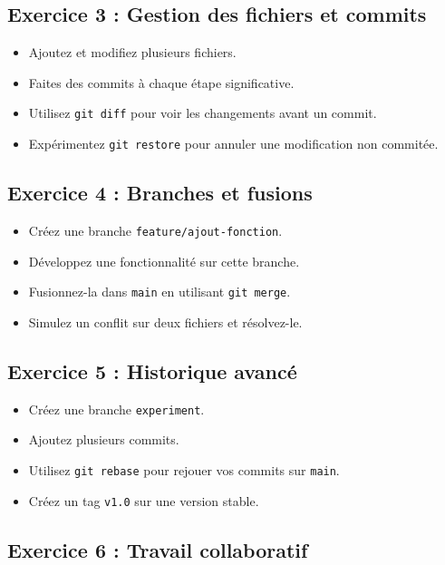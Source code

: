 \documentclass[a4paper,12pt]{article}
\begin{document}
\subsection*{Exercice 3 : Gestion des fichiers et commits}

\begin{itemize}
    \item Ajoutez et modifiez plusieurs fichiers.
    \item Faites des commits à chaque étape significative.
    \item Utilisez \texttt{git diff} pour voir les changements avant un commit.
    \item Expérimentez \texttt{git restore} pour annuler une modification non commitée.
\end{itemize}

\subsection*{Exercice 4 : Branches et fusions}

\begin{itemize}
    \item Créez une branche \texttt{feature/ajout-fonction}.
    \item Développez une fonctionnalité sur cette branche.
    \item Fusionnez-la dans \texttt{main} en utilisant \texttt{git merge}.
    \item Simulez un conflit sur deux fichiers et résolvez-le.
\end{itemize}

\subsection*{Exercice 5 : Historique avancé}

\begin{itemize}
    \item Créez une branche \texttt{experiment}.
    \item Ajoutez plusieurs commits.
    \item Utilisez \texttt{git rebase} pour rejouer vos commits sur \texttt{main}.
    \item Créez un tag \texttt{v1.0} sur une version stable.
\end{itemize}

\subsection*{Exercice 6 : Travail collaboratif}
\end{document}
